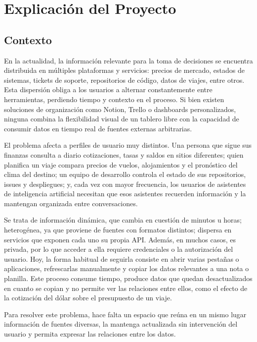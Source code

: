 \chapter{Explicación del Proyecto}

\section{Contexto}
En la actualidad, la información relevante para la toma de decisiones se encuentra distribuida en múltiples plataformas y servicios: precios de mercado, estados de sistemas, tickets de soporte, repositorios de código, datos de viajes, entre otros. Esta dispersión obliga a los usuarios a alternar constantemente entre herramientas, perdiendo tiempo y contexto en el proceso. Si bien existen soluciones de organización como Notion, Trello o dashboards personalizados, ninguna combina la flexibilidad visual de un tablero libre con la capacidad de consumir datos en tiempo real de fuentes externas arbitrarias.

El problema afecta a perfiles de usuario muy distintos. Una persona que sigue sus finanzas consulta a diario cotizaciones, tasas y saldos en sitios diferentes; quien planifica un viaje compara precios de vuelos, alojamientos y el pronóstico del clima del destino; un equipo de desarrollo controla el estado de sus repositorios, issues y despliegues; y, cada vez con mayor frecuencia, los usuarios de asistentes de inteligencia artificial necesitan que esos asistentes recuerden información y la mantengan organizada entre conversaciones.

Se trata de información dinámica, que cambia en cuestión de minutos u horas; heterogénea, ya que proviene de fuentes con formatos distintos; dispersa en servicios que exponen cada uno su propia API. Además, en muchos casos, es privada, por lo que acceder a ella requiere credenciales o la autorización del usuario. Hoy, la forma habitual de seguirla consiste en abrir varias pestañas o aplicaciones, refrescarlas manualmente y copiar los datos relevantes a una nota o planilla. Este proceso consume tiempo, produce datos que quedan desactualizados en cuanto se copian y no permite ver las relaciones entre ellos, como el efecto de la cotización del dólar sobre el presupuesto de un viaje.

Para resolver este problema, hace falta un espacio que reúna en un mismo lugar información de fuentes diversas, la mantenga actualizada sin intervención del usuario y permita expresar las relaciones entre los datos.


